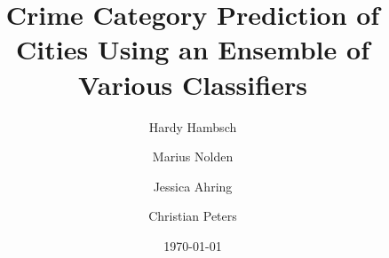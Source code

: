 \ifluatex

\usepackage{fontspec}


\else

\usepackage[utf8]{inputenc}

\usepackage[T1]{fontenc}
\fi

\usepackage[english]{babel}

\usepackage{graphicx}
\usepackage{color}
\usepackage{float}

\usepackage[english]{fancyref}


\usepackage{setspace}

\usepackage[backend=biber,
autolang=hyphen,
style=alphabetic,
citestyle=alphabetic,
giveninits=false
]{biblatex}

\title[Crime Category Prediction of Cities]{Crime Category Prediction of Cities Using an Ensemble of Various Classifiers}
\author[Hambsch \and Nolden \and Ahring \and Peters] {
	Hardy Hambsch
	\and
	Marius Nolden
	\and
	Jessica Ahring
	\and
	Christian Peters
}
\date{\today}
